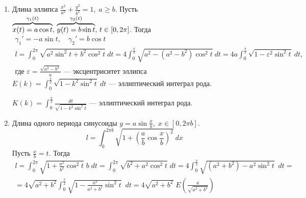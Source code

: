 \begin{examples}
  \begin{enumerate}
    \item Длина эллипса $\frac{x^2}{a^2} + \frac{y^2}{b^2} = 1, \; a \geq b$. Пусть $\overbrace{x(t) = a\cos t}^{\mathclap{\gamma_1(t)}}, \, \overbrace{y(t) = b\sin t}^{\mathclap{\gamma_2(t)}}, \, t \in [0, 2\pi]$. Тогда
    \begin{equation*}
      \begin{gathered}
        \gamma_1' = -a\sin t, \quad \gamma_2' = b \cos t \\
        l = \int_{0}^{2\pi}\sqrt{a^2\sin^2  t + b^2\cos^2 t} \: dt =
        4\int_{0}^{\frac{\pi}{2}}\sqrt{a^2 - (a^2 - b^2)\cos^2 t} \: dt
        = 4a\int_{0}^{\frac{\pi}{2}}\sqrt{1 - \varepsilon^2\sin^2 t} \: dt
        \text{,} \\ \text{где } \varepsilon = \frac{\sqrt{a^2 - b^2}}{a}\text{ --- эксцентриситет эллипса}
      \end{gathered}
    \end{equation*}
    $ \displaystyle
        E(k) = \int_{0}^{\frac{\pi}{2}}\sqrt{1 - k^2\sin^2 t} \: dt
    $ --- эллиптический интеграл  рода.

    $ \displaystyle
        K(k) = \int_{0}^{\frac{\pi}{2}} \frac{dt}{\sqrt{1 - k^2\sin^2 t}}
    $ --- эллиптический интеграл  рода.
    \item Длина одного периода синусоиды $y = a\sin \frac{x}{b}, \; x \in [0, 2\pi b]$.
    \begin{equation*}
      l = \int_{0}^{2\pi b}\sqrt{1 + \left(\frac{a}{b}\cos \frac{x}{b}\right)^2} \: dx
    \end{equation*}
    Пусть $\frac{x}{b} = t$. Тогда
    \begin{equation*}
      \begin{gathered}
        l = \int_{0}^{2\pi} \sqrt{1 + \frac{a^2}{b^2}\cos^2 t} \; b \; dt =
        \int_{0}^{2\pi} \sqrt{b^2 + a^2\cos^2 t} \; dt =
        4\int_{0}^{\frac{\pi}{2}}\sqrt{(a^2 + b^2) - a^2\sin^2 t} \; \: dt = \\
        = 4\sqrt{a^2 + b^2}\int_{0}^{\frac{\pi}{2}}\sqrt{1 - \frac{a^2}{a^2 + b^2}\sin^2 t} \; \: dt
        = 4\sqrt{a^2 + b^2} \; E\left(\frac{a}{\sqrt{a^2 + b^2}}\right)
      \end{gathered}
    \end{equation*}
  \end{enumerate}
\end{examples}

